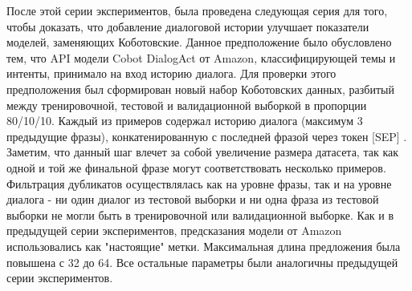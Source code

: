 \begin{table}[htbp]
\centering
\caption {Accuracy(f1) без диалоговой истории для многозадачной модели с одним линейным слоем}
\label{mtldream:1}%
\end{table}



После этой серии экспериментов, была проведена следующая серия для того, чтобы доказать, что добавление диалоговой истории улучшает показатели моделей, заменяющих Коботовские. Данное предположение было обусловлено тем, что API модели Cobot DialogAct от Amazon, классифицирующей темы и интенты, принимало на вход историю диалога. 
Для проверки этого предположения был сформирован новый набор Коботовских данных, разбитый между тренировочной, тестовой и валидационной выборкой в пропорции 80/10/10. Каждый из примеров содержал историю диалога (максимум 3 предыдущие фразы), конкатенированную с последней фразой через токен [SEP] . Заметим, что данный шаг влечет за собой увеличение размера датасета, так как одной и той же финальной фразе могут соответствовать несколько примеров. Фильтрация дубликатов осуществлялась как на уровне фразы, так и на уровне диалога - ни один диалог из тестовой выборки и ни одна фраза из тестовой выборки не могли быть в тренировочной или валидационной выборке. Как и в предыдущей серии экспериментов, предсказания модели от Amazon использовались как "настоящие" метки. Максимальная длина предложения была повышена с 32 до 64. Все остальные параметры были аналогичны предыдущей серии экспериментов.


